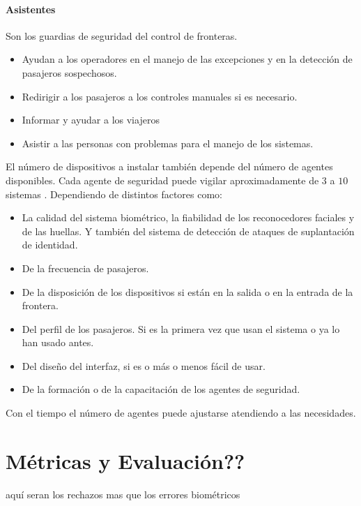 \paragraph{Asistentes\\}

Son los guardias de seguridad del control de fronteras.

\begin{itemize}
    \item 
    Ayudan a los operadores en el manejo de las excepciones y en la detección de pasajeros sospechosos.
    \item
    Redirigir a los pasajeros a los controles manuales si es necesario.
    \item
    Informar y ayudar a los viajeros
    \item
    Asistir a las personas con problemas para el manejo de los sistemas.
\end{itemize}
    
El número de dispositivos  a instalar también depende del número de agentes disponibles. Cada agente de seguridad puede vigilar aproximadamente de $3$ a $10$ sistemas  \cite{FRONTEX2016OpeReport}. Dependiendo de distintos factores como:

\begin{itemize}
    \item 
    La calidad del sistema biométrico, la fiabilidad de los reconocedores faciales y de las huellas. Y también del sistema de detección de ataques de suplantación de identidad.
    \item
    De la frecuencia de pasajeros.
    \item
    De la disposición de los dispositivos si están en la salida o en la entrada de la frontera.
    \item
    Del perfil de los pasajeros. Si es la primera vez que usan el sistema o ya lo han usado antes.
    \item
    Del diseño del interfaz, si es o más o menos fácil de usar.
    \item
    De la formación o de la capacitación de los agentes de seguridad.
\end{itemize}

Con el tiempo el número de agentes puede ajustarse atendiendo a las necesidades. 

 
 
\section{Métricas y Evaluación??}
\color{cyan} aquí seran los rechazos mas que los errores biométricos\color{black}

